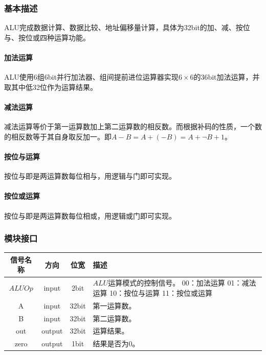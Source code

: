 \documentclass[main.tex]{subfiles}
\begin{document}
\subsubsection{基本描述}
ALU完成数据计算、数据比较、地址偏移量计算，具体为32bit的加、减、按位与、按位或四种运算功能。
\paragraph{加法运算}
ALU使用6组6bit并行加法器、组间提前进位运算器实现$6 \times 6$的36bit加法运算，并取其中低32位作为运算结果。
\paragraph{减法运算}
减法运算等价于第一运算数加上第二运算数的相反数。而根据补码的性质，一个数的相反数等于其自身取反加一。即$A-B = A+(-B) = A+\neg B+1$。
\paragraph{按位与运算}
按位与即是两运算数每位相与，用逻辑与门即可实现。
\paragraph{按位或运算}
按位与即是两运算数每位相或，用逻辑或门即可实现。

\subsubsection{模块接口}
\begin{center}
    \begin{tabular}{c c c l}
        \toprule
        信号名称 & 方向 & 位宽 & 描述 \\
        \midrule
        $ALUOp$ & input & 2bit & \makecell[lt]{
            $ALU$运算模式的控制信号。\\
             00：加法运算\\
             01：减法运算\\
             10：按位与运算 \\
             11：按位或运算
        } \\
        \midrule
        A & input & 32bit & 第一运算数。 \\
        B & input & 32bit & 第二运算数。 \\
        out & output & 32bit & 运算结果。 \\
        zero & output & 1bit & 结果是否为0。 \\
        \bottomrule
    \end{tabular}
\end{center}
\end{document}
